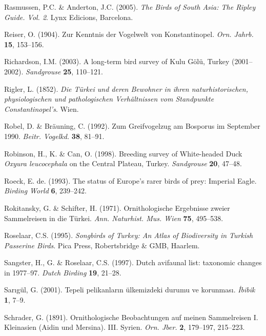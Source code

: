 \documentclass[
  a4paper,
  DIV=11,
  numbers=noendperiod]{scrreprt}
\newlength{\cslhangindent}
\newenvironment{CSLReferences}[2] %
 {\begin{list}{}{%
  \setlength{\itemindent}{0pt}
  \setlength{\leftmargin}{0pt}
  \setlength{\parsep}{0pt}
  \ifodd #1
   \setlength{\leftmargin}{\cslhangindent}
   \setlength{\itemindent}{-1\cslhangindent}
  \fi
  \setlength{\itemsep}{#2\baselineskip}}}
 {\end{list}}
\begin{document}
\begin{CSLReferences}{1}{1}
Rasmussen, P.C. \& Anderton, J.C. (2005). \emph{{The Birds of South
Asia: The Ripley Guide. Vol. 2}}. Lynx Edicions, Barcelona.

Reiser, O. (1904). {Zur Kenntnis der Vogelwelt von Konstantinopel}.
\emph{Orn. Jahrb.} \textbf{15}, 153--156.

Richardson, I.M. (2003). {A long-term bird survey of Kulu Gölü, Turkey
(2001--2002)}. \emph{Sandgrouse} \textbf{25}, 110--121.

Rigler, L. (1852). \emph{{Die Türkei und deren Bewohner in ihren
naturhistorischen, physiologischen und pathologischen Verhältnissen vom
Standpunkte Constantinopel's}}. Wien.

Robel, D. \& Bräuning, C. (1992). {Zum Greifvogelzug am Bosporus im
September 1990}. \emph{Beitr. Vogelkd.} \textbf{38}, 81--91.

Robinson, H., K. \& Can, O. (1998). {Breeding survey of White-headed
Duck \emph{Oxyura leucocephala} on the Central Plateau, Turkey}.
\emph{Sandgrouse} \textbf{20}, 47--48.

Roeck, E. de. (1993). {The status of Europe's rarer birds of prey:
Imperial Eagle}. \emph{Birding World} \textbf{6}, 239--242.

Rokitansky, G. \& Schifter, H. (1971). {Ornithologische Ergebnisse
zweier Sammelreisen in die Türkei}. \emph{Ann. Naturhist. Mus. Wien}
\textbf{75}, 495--538.

Roselaar, C.S. (1995). \emph{{Songbirds of Turkey: An Atlas of
Biodiversity in Turkish Passerine Birds}}. Pica Press, Robertsbridge \&
GMB, Haarlem.

Sangster, H., G. \& Roselaar, C.S. (1997). {Dutch avifaunal list:
taxonomic changes in 1977--97}. \emph{Dutch Birding} \textbf{19},
21--28.

Sarıgül, G. (2001). {Tepeli pelikanların ülkemizdeki durumu ve
korunması}. \emph{İbibik} \textbf{1}, 7--9.

Schrader, G. (1891). {Ornithologische Beobachtungen auf meinen
Sammelreisen I. Kleinasien (Aidin und Mersina). III. Syrien}. \emph{Orn.
Jber.} \textbf{2}, 179--197, 215--223.


\end{CSLReferences}
\end{document}
